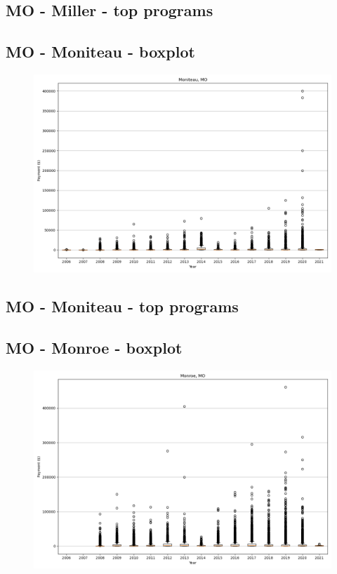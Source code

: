 \subsection*{MO - Miller - top programs}

\newpage
\subsection*{MO - Moniteau - boxplot}
\begin{figure}[h]
\centering
\includegraphics[width=7in]{../output/boxplots/counties/Moniteau-MO_boxplot.png}
\end{figure}


\subsection*{MO - Moniteau - top programs}

\newpage
\subsection*{MO - Monroe - boxplot}
\begin{figure}[h]
\centering
\includegraphics[width=7in]{../output/boxplots/counties/Monroe-MO_boxplot.png}
\end{figure}


